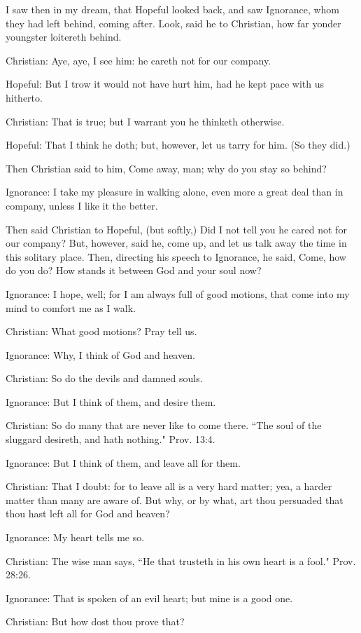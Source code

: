 I saw then in my dream, that Hopeful looked back, and saw Ignorance, whom they had left behind, coming after. Look, said he to Christian, how far yonder youngster loitereth behind.

Christian: Aye, aye, I see him: he careth not for our company.

Hopeful: But I trow it would not have hurt him, had he kept pace with us hitherto.

Christian: That is true; but I warrant you he thinketh otherwise.

Hopeful: That I think he doth; but, however, let us tarry for him. (So they did.)

Then Christian said to him, Come away, man; why do you stay so behind?

Ignorance: I take my pleasure in walking alone, even more a great deal than in company, unless I like it the better.

Then said Christian to Hopeful, (but softly,) Did I not tell you he cared not for our company? But, however, said he, come up, and let us talk away the time in this solitary place. Then, directing his speech to Ignorance, he said, Come, how do you do? How stands it between God and your soul now?

Ignorance: I hope, well; for I am always full of good motions, that come into my mind to comfort me as I walk.

Christian: What good motions? Pray tell us.

Ignorance: Why, I think of God and heaven.

Christian: So do the devils and damned souls.

Ignorance: But I think of them, and desire them.

Christian: So do many that are never like to come there. ``The soul of the sluggard desireth, and hath nothing." Prov. 13:4.

Ignorance: But I think of them, and leave all for them.

Christian: That I doubt: for to leave all is a very hard matter; yea, a harder matter than many are aware of. But why, or by what, art thou persuaded that thou hast left all for God and heaven?

Ignorance: My heart tells me so.

Christian: The wise man says, ``He that trusteth in his own heart is a fool." Prov. 28:26.

Ignorance: That is spoken of an evil heart; but mine is a good one.

Christian: But how dost thou prove that?


